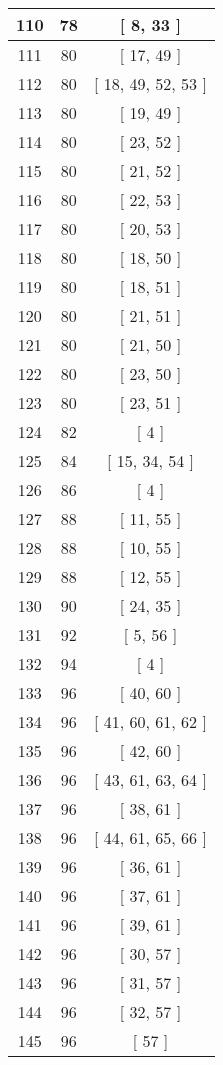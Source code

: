 \begin{center}
\begin{longtable}[H]{|| c c c ||}
\hline
110 & 78 & [ 8, 33 ] \\ 
\hline
111 & 80 & [ 17, 49 ] \\ 
\hline
112 & 80 & [ 18, 49, 52, 53 ] \\ 
\hline
113 & 80 & [ 19, 49 ] \\ 
\hline
114 & 80 & [ 23, 52 ] \\ 
\hline
115 & 80 & [ 21, 52 ] \\ 
\hline
116 & 80 & [ 22, 53 ] \\ 
\hline
117 & 80 & [ 20, 53 ] \\ 
\hline
118 & 80 & [ 18, 50 ] \\ 
\hline
119 & 80 & [ 18, 51 ] \\ 
\hline
120 & 80 & [ 21, 51 ] \\ 
\hline
121 & 80 & [ 21, 50 ] \\ 
\hline
122 & 80 & [ 23, 50 ] \\ 
\hline
123 & 80 & [ 23, 51 ] \\ 
\hline
124 & 82 & [ 4 ] \\ 
\hline
125 & 84 & [ 15, 34, 54 ] \\ 
\hline
126 & 86 & [ 4 ] \\ 
\hline
127 & 88 & [ 11, 55 ] \\ 
\hline
128 & 88 & [ 10, 55 ] \\ 
\hline
129 & 88 & [ 12, 55 ] \\ 
\hline
130 & 90 & [ 24, 35 ] \\ 
\hline
131 & 92 & [ 5, 56 ] \\ 
\hline
132 & 94 & [ 4 ] \\ 
\hline
133 & 96 & [ 40, 60 ] \\ 
\hline
134 & 96 & [ 41, 60, 61, 62 ] \\ 
\hline
135 & 96 & [ 42, 60 ] \\ 
\hline
136 & 96 & [ 43, 61, 63, 64 ] \\ 
\hline
137 & 96 & [ 38, 61 ] \\ 
\hline
138 & 96 & [ 44, 61, 65, 66 ] \\ 
\hline
139 & 96 & [ 36, 61 ] \\ 
\hline
140 & 96 & [ 37, 61 ] \\ 
\hline
141 & 96 & [ 39, 61 ] \\ 
\hline
142 & 96 & [ 30, 57 ] \\ 
\hline
143 & 96 & [ 31, 57 ] \\ 
\hline
144 & 96 & [ 32, 57 ] \\ 
\hline
145 & 96 & [ 57 ] \\ 

\end{longtable}
\end{center}
